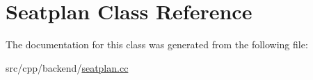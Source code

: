 \hypertarget{classSeatplan}{\section{Seatplan Class Reference}
\label{classSeatplan}
}


The documentation for this class was generated from the following file\-:\begin{DoxyCompactItemize}
\item 
src/cpp/backend/\hyperlink{seatplan_8cc}{seatplan.\-cc}\end{DoxyCompactItemize}

